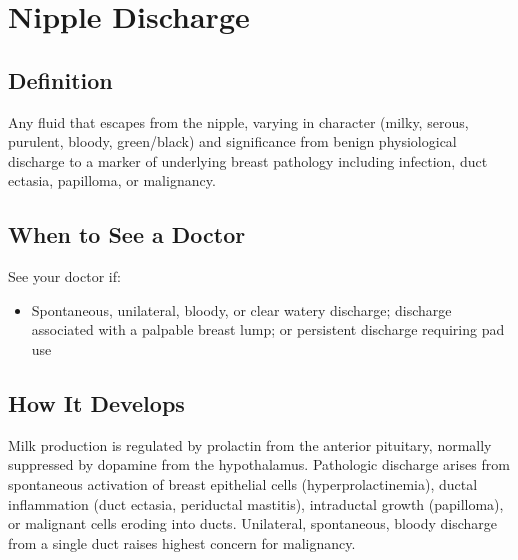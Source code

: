 \chapter{Nipple Discharge}

\section*{Definition}
Any fluid that escapes from the nipple, varying in character (milky, serous, purulent, bloody, green/black) and significance from benign physiological discharge to a marker of underlying breast pathology including infection, duct ectasia, papilloma, or malignancy.

\section*{When to See a Doctor}
See your doctor if:
\begin{itemize}
  \item Spontaneous, unilateral, bloody, or clear watery discharge; discharge associated with a palpable breast lump; or persistent discharge requiring pad use
\end{itemize}

\section*{How It Develops}
Milk production is regulated by prolactin from the anterior pituitary, normally suppressed by dopamine from the hypothalamus. Pathologic discharge arises from spontaneous activation of breast epithelial cells (hyperprolactinemia), ductal inflammation (duct ectasia, periductal mastitis), intraductal growth (papilloma), or malignant cells eroding into ducts. Unilateral, spontaneous, bloody discharge from a single duct raises highest concern for malignancy.

